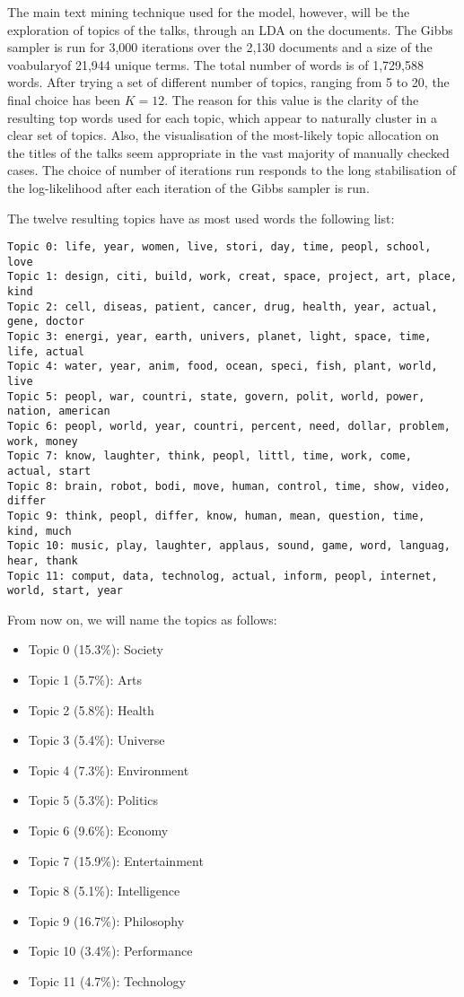 \documentclass[a4paper, 11pt]{article} %
\begin{document}
The main text mining technique used for the model, however, will be the exploration of topics of the talks, through an LDA on the documents. The Gibbs sampler is run for 3,000 iterations over the 2,130 documents and a size of the voabularyof 21,944 unique terms. The total number of words is of 1,729,588 words. After trying a set of different number of topics, ranging from 5 to 20, the final choice has been $K=12$. The reason for this value is the clarity of the resulting top words used for each topic, which appear to naturally cluster in a clear set of topics. Also, the visualisation of the most-likely topic allocation on the titles of the talks seem appropriate in the vast majority of manually checked cases. The choice of number of iterations run responds to the long stabilisation of the log-likelihood after each iteration of the Gibbs sampler is run.

The twelve resulting topics have as most used words the following list:

\begin{verbatim}
Topic 0: life, year, women, live, stori, day, time, peopl, school, love
Topic 1: design, citi, build, work, creat, space, project, art, place, kind
Topic 2: cell, diseas, patient, cancer, drug, health, year, actual, gene, doctor
Topic 3: energi, year, earth, univers, planet, light, space, time, life, actual
Topic 4: water, year, anim, food, ocean, speci, fish, plant, world, live
Topic 5: peopl, war, countri, state, govern, polit, world, power, nation, american
Topic 6: peopl, world, year, countri, percent, need, dollar, problem, work, money
Topic 7: know, laughter, think, peopl, littl, time, work, come, actual, start
Topic 8: brain, robot, bodi, move, human, control, time, show, video, differ
Topic 9: think, peopl, differ, know, human, mean, question, time, kind, much
Topic 10: music, play, laughter, applaus, sound, game, word, languag, hear, thank
Topic 11: comput, data, technolog, actual, inform, peopl, internet, world, start, year
\end{verbatim}

From now on, we will name the topics as follows:

\begin{itemize}
\item Topic 0 (15.3\%): Society
\item Topic 1 (5.7\%): Arts
\item Topic 2 (5.8\%): Health
\item Topic 3 (5.4\%): Universe
\item Topic 4 (7.3\%): Environment
\item Topic 5 (5.3\%): Politics
\item Topic 6 (9.6\%): Economy
\item Topic 7 (15.9\%): Entertainment
\item Topic 8 (5.1\%): Intelligence
\item Topic 9 (16.7\%): Philosophy
\item Topic 10 (3.4\%): Performance
\item Topic 11 (4.7\%): Technology
\end{itemize}
\end{document}
